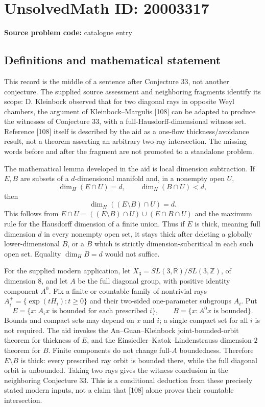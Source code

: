 \documentclass[11pt]{article}
\newcommand{\Z}{\mathbb{Z}}
\newcommand{\R}{\mathbb{R}}
\begin{document}
\section*{UnsolvedMath ID: 20003317}
\textbf{Source problem code:} catalogue entry
\subsection{Definitions and mathematical statement}
This record is the middle of a sentence after Conjecture 33, not another conjecture. The supplied source assessment and neighboring fragments identify its scope: D. Kleinbock observed that for two diagonal rays in opposite Weyl chambers, the argument of Kleinbock--Margulis [108] can be adapted to produce the witnesses of Conjecture 33, with a full-Hausdorff-dimensional witness set. Reference [108] itself is described by the aid as a one-flow thickness/avoidance result, not a theorem asserting an arbitrary two-ray intersection. The missing words before and after the fragment are not promoted to a standalone problem.

The mathematical lemma developed in the aid is local dimension subtraction. If $E,B$ are subsets of a $d$-dimensional manifold and, in a nonempty open $U$,
\[
 \dim_H(E\cap U)=d,\qquad\dim_H(B\cap U)<d,
\]
then
\[
 \dim_H((E\setminus B)\cap U)=d.
\]
This follows from $E\cap U=((E\setminus B)\cap U)\cup(E\cap B\cap U)$ and the maximum rule for the Hausdorff dimension of a finite union. Thus if $E$ is thick, meaning full dimension $d$ in every nonempty open set, it stays thick after deleting a globally lower-dimensional $B$, or a $B$ which is strictly dimension-subcritical in each such open set. Equality $\dim_HB=d$ would not suffice.

For the supplied modern application, let $X_3=SL(3,\R)/SL(3,\Z)$, of dimension $8$, and let $A$ be the full diagonal group, with positive identity component $A^0$. Fix a finite or countable family of nontrivial rays $A_i^+=\{\exp(tH_i):t\geq0\}$ and their two-sided one-parameter subgroups $A_i$. Put
\[
 E=\{x:A_ix\text{ is bounded for each prescribed }i\},\qquad
 B=\{x:A^0x\text{ is bounded}\}.
\]
Bounds and compact sets may depend on $x$ and $i$; a single compact set for all $i$ is not required. The aid invokes the An--Guan--Kleinbock joint-bounded-orbit theorem for thickness of $E$, and the Einsiedler--Katok--Lindenstrauss dimension-$2$ theorem for $B$. Finite components do not change full-$A$ boundedness. Therefore $E\setminus B$ is thick: every prescribed ray orbit is bounded there, while the full diagonal orbit is unbounded. Taking two rays gives the witness conclusion in the neighboring Conjecture 33. This is a conditional deduction from these precisely stated modern inputs, not a claim that [108] alone proves their countable intersection.
\end{document}
